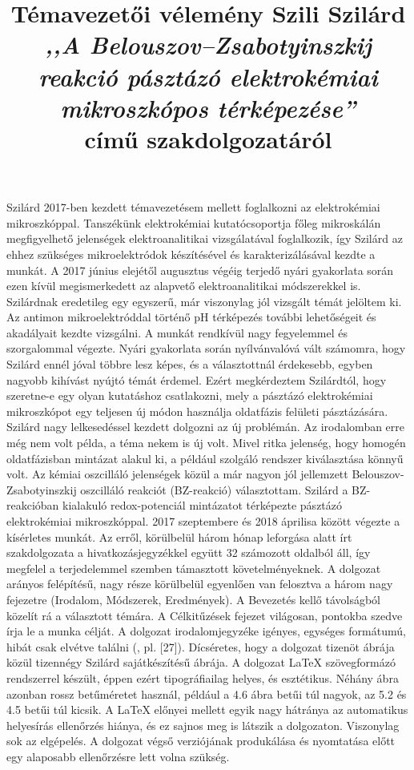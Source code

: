 \documentclass[a4paper, 11pt, oneside, bibliography=totoc]{article}
\begin{document}
\title{Témavezetői vélemény Szili Szilárd \\ \textit{,,A Belouszov--Zsabotyinszkij reakció pásztázó elektrokémiai mikroszkópos térképezése''} \\ című szakdolgozatáról}

\maketitle

Szilárd 2017-ben kezdett témavezetésem mellett foglalkozni az elektrokémiai mikroszkóppal. Tanszékünk elektrokémiai kutatócsoportja főleg mikroskálán megfigyelhető jelenségek elektroanalitikai vizsgálatával foglalkozik, így Szilárd az ehhez szükséges mikroelektródok készítésével és karakterizálásával kezdte a munkát. A 2017 június elejétől augusztus végéig terjedő nyári gyakorlata során ezen kívül megismerkedett az alapvető elektroanalitikai módszerekkel is. Szilárdnak eredetileg egy egyszerű, már viszonylag jól vizsgált témát jelöltem ki. Az antimon mikroelektróddal történő pH térképezés további lehetőségeit és akadályait kezdte vizsgálni. A munkát rendkívül nagy fegyelemmel és szorgalommal végezte. Nyári gyakorlata során nyílvánvalóvá vált számomra, hogy Szilárd ennél jóval többre lesz képes, és a választottnál érdekesebb, egyben nagyobb kihívást nyújtó témát érdemel. Ezért megkérdeztem Szilárdtól, hogy szeretne-e egy olyan kutatáshoz csatlakozni, mely a pásztázó elektrokémiai mikroszkópot egy teljesen új módon használja oldatfázis felületi pásztázására. Szilárd nagy lelkesedéssel kezdett dolgozni az új problémán. Az irodalomban erre még nem volt példa, a téma nekem is új volt. Mivel ritka jelenség, hogy homogén oldatfázisban mintázat alakul ki, a például szolgáló rendszer kiválasztása könnyű volt. Az kémiai oszcilláló jelenségek közül a már nagyon jól jellemzett Belouszov-Zsabotyinszkij oszcilláló reakciót (BZ-reakció) választottam. Szilárd a BZ-reakcióban kialakuló redox-potenciál mintázatot térképezte pásztázó elektrokémiai mikroszkóppal. 2017 szeptembere és 2018 áprilisa között végezte a kísérletes munkát. Az erről, körülbelül három hónap leforgása alatt írt szakdolgozata a hivatkozásjegyzékkel együtt 32 számozott oldalból áll, így megfelel a terjedelemmel szemben támasztott követelményeknek. A dolgozat arányos felépítésű, nagy része körülbelül egyenlően van felosztva a három nagy fejezetre (Irodalom, Módszerek, Eredmények). A Bevezetés kellő távolságból közelít rá a választott témára. A Célkitűzések fejezet világosan, pontokba szedve írja le a munka célját. A dolgozat irodalomjegyzéke igényes, egységes formátumú, hibát csak elvétve találni (, pl. [27]). Dícséretes, hogy a dolgozat tizenöt ábrája közül tizennégy Szilárd sajátkészítésű ábrája. A dolgozat LaTeX szövegformázó rendszerrel készült, éppen ezért tipográfiailag helyes, és esztétikus. Néhány ábra azonban rossz betűméretet használ, például a 4.6 ábra betűi túl nagyok, az 5.2 és 4.5 betűi túl kicsik. A LaTeX előnyei mellett egyik nagy hátránya az automatikus helyesírás ellenőrzés hiánya, és ez sajnos meg is látszik a dolgozaton. Viszonylag sok az elgépelés. A dolgozat végső verziójának produkálása és nyomtatása előtt egy alaposabb ellenőrzésre lett volna szükség. 
\end{document}
